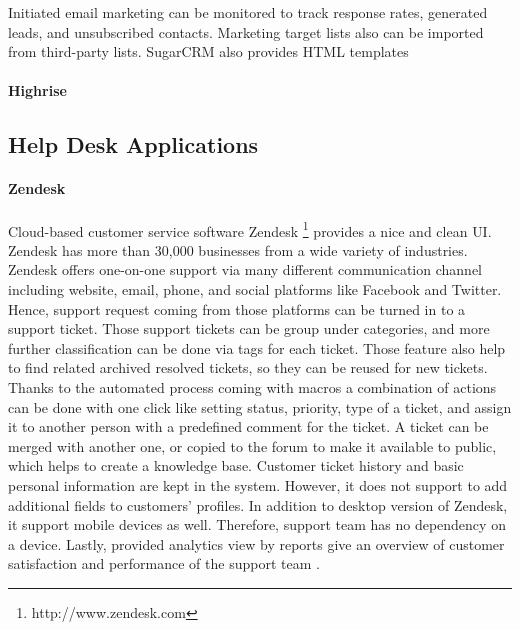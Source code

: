 Initiated email marketing can be monitored to track response rates, generated leads, and unsubscribed contacts. Marketing target lists also can be imported from third-party lists. SugarCRM also provides \ac{HTML} templates 

\paragraph{Highrise}


\subsection{Help Desk Applications}
\label{subsec:3.3.2:HelpDeskAppl}


\paragraph{Zendesk}
Cloud-based customer service software Zendesk \footnote{http://www.zendesk.com} provides a nice and clean \ac{UI}. Zendesk has more than 30,000 businesses from a wide variety of industries. Zendesk offers one-on-one support via many different communication channel including website, email, phone, and social platforms like Facebook and Twitter. Hence, support request coming from those platforms can be turned in to a support ticket. Those support tickets can be group under categories, and more further classification can be done via tags for each ticket. Those feature also help to find related archived resolved tickets, so they can be reused for new tickets. Thanks to the automated process coming with macros a combination of actions can be done with one click like setting status, priority, type of a ticket, and assign it to another person with a predefined comment for the ticket. A ticket can be merged with another one, or copied to the forum to make it available to public, which helps to create a knowledge base. Customer ticket history and basic personal information are kept in the system. However, it does not support to add additional fields to customers' profiles. In addition to desktop version of Zendesk, it support mobile devices as well. Therefore, support team has no dependency on a device. Lastly, provided analytics view by reports give an overview of customer satisfaction and performance of the support team \citep{Zendesk2013,Zendesk2013a}.


